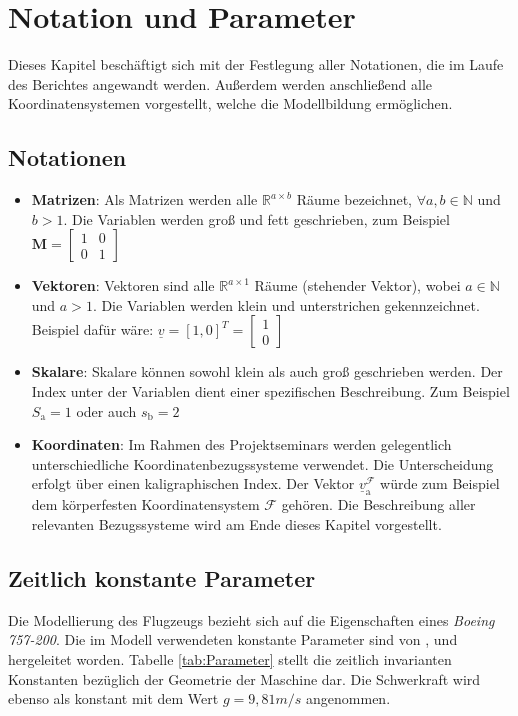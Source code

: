 \chapter{Notation und Parameter}\label{cha:Notation}
\label{PN}
Dieses Kapitel beschäftigt sich mit der Festlegung aller Notationen, die im Laufe des Berichtes angewandt werden. Außerdem werden anschließend alle Koordinatensystemen vorgestellt, welche die Modellbildung ermöglichen.

\section{Notationen}
\begin{itemize}
\item \textbf{Matrizen}: Als Matrizen werden alle $\mathbb{R}^{a\times b}$ Räume bezeichnet, $\forall a,b \in \mathbb{N}$ und $b>1$. Die Variablen werden groß und fett geschrieben, zum Beispiel $\textbf{M} = \begin{bmatrix} 
1 & 0\\
0 & 1
\end{bmatrix}$
\item \textbf{Vektoren}: Vektoren sind alle $\mathbb{R}^{a\times 1}$ Räume (stehender Vektor), wobei $a \in \mathbb{N}$ und $a>1$. Die Variablen werden klein und unterstrichen gekennzeichnet. Beispiel dafür wäre: $\underline{v} = [1,0]^T = \begin{bmatrix} 
1 \\
0 
\end{bmatrix}$
\item \textbf{Skalare}: Skalare können sowohl klein als auch groß geschrieben werden. Der Index unter der Variablen dient einer spezifischen Beschreibung. Zum Beispiel $S_\mathrm{a} = 1$ oder auch $s_\mathrm{b} = 2$
\item \textbf{Koordinaten}: Im Rahmen des Projektseminars werden gelegentlich unterschiedliche Koordinatenbezugssysteme verwendet. Die Unterscheidung erfolgt über einen kaligraphischen Index. Der Vektor $\underline{v}_\mathrm{a}^\mathcal{F}$ würde zum Beispiel dem körperfesten Koordinatensystem $\mathcal{F}$ gehören. Die Beschreibung aller relevanten Bezugssysteme wird am Ende dieses Kapitel vorgestellt.
\end{itemize}
\section{Zeitlich konstante Parameter}
Die Modellierung des Flugzeugs bezieht sich auf die Eigenschaften eines \textit{Boeing 757-200}. Die im Modell verwendeten konstante Parameter sind von \cite{B7571}, \cite{B7572} und \cite{RAMPaper} hergeleitet worden. Tabelle \ref{tab:Parameter} stellt die zeitlich invarianten Konstanten bezüglich der Geometrie der Maschine dar. Die Schwerkraft wird ebenso als konstant mit dem Wert $g = 9,81 m/s$ angenommen.


